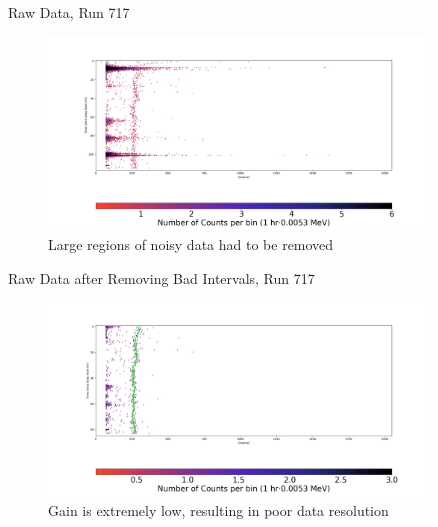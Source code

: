 \documentclass[aspectratio=169]{beamer}
\begin{document}
\begin{frame}{Raw Data, Run 717}
    \begin{figure}
        \begin{center}
            \includegraphics[width=0.9\textwidth]
            {assets/717/RD.png}
            \caption{Large regions of noisy data had to be removed}
        \end{center}
    \end{figure}
\end{frame}

\begin{frame}{Raw Data after Removing Bad Intervals, Run 717}
    \begin{figure}
        \begin{center}
            \includegraphics[width=0.9\textwidth]
            {assets/717/RDP.png}
            \caption{Gain is extremely low, resulting in poor data resolution}
        \end{center}
    \end{figure}
\end{frame}
\end{document}

